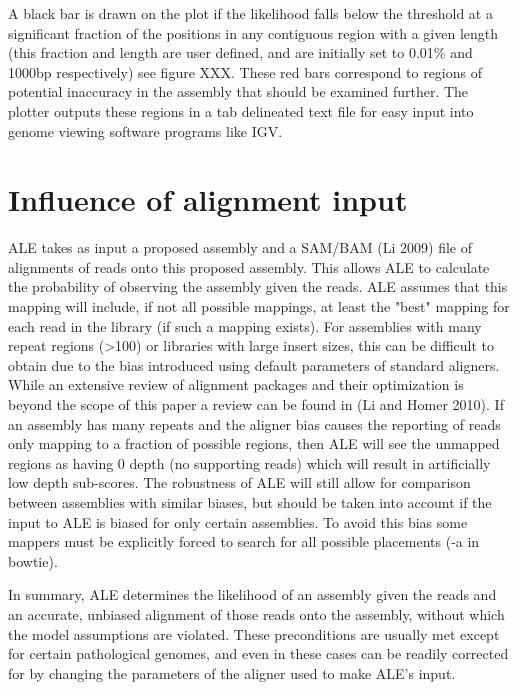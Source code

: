 \documentclass[phd,tocprelim]{cornell}
\begin{document}
A black bar is drawn on the plot if the likelihood falls below the threshold at a significant fraction of the positions in any contiguous region with a given length (this fraction and length are user defined, and are initially set to 0.01\% and 1000bp respectively) see figure XXX. These red bars correspond to regions of potential inaccuracy in the assembly that should be examined further. The plotter outputs these regions in a tab delineated text file for easy input into genome viewing software programs like IGV.


\section{Influence of alignment input} %
\label{sec:Influence of alignment input}

ALE takes as input a proposed assembly and a SAM/BAM (Li 2009) file of alignments of reads onto this proposed assembly. This allows ALE to calculate the probability of observing the assembly given the reads. ALE assumes that this mapping will include, if not all possible mappings, at least the "best" mapping for each read in the library (if such a mapping exists). For assemblies with many repeat regions (>100) or libraries with large insert sizes, this can be difficult to obtain due to the bias introduced using default parameters of standard aligners. While an extensive review of alignment packages and their optimization is beyond the scope of this paper a review can be found in (Li and Homer 2010). If an assembly has many repeats and the aligner bias causes the reporting of reads only mapping to a fraction of possible regions, then ALE will see the unmapped regions as having 0 depth (no supporting reads) which will result in artificially low depth sub-scores. The robustness of ALE will still allow for comparison between assemblies with similar biases, but should be taken into account if the input to ALE is biased for only certain assemblies. To avoid this bias some mappers must be explicitly forced to search for all possible placements (-a in bowtie).

In summary, ALE determines the likelihood of an assembly given the reads and an accurate, unbiased alignment of those reads onto the assembly, without which the model assumptions are violated. These preconditions are usually met except for certain pathological genomes, and even in these cases can be readily corrected for by changing the parameters of the aligner used to make ALE’s input.
\end{document}

